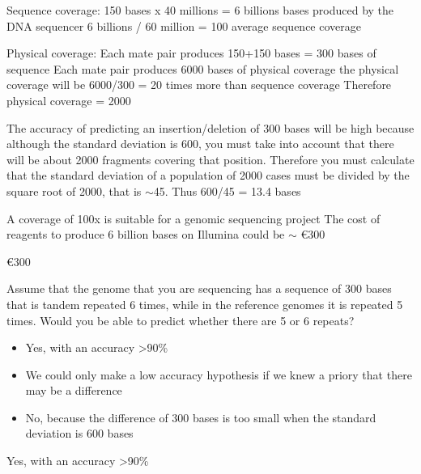 \begin{Answer} [
  ref={ex30},
  number={1}
 ]

Sequence coverage:
150 bases x 40 millions = 6 billions bases produced by the DNA sequencer
6 billions / 60 million = 100 average sequence coverage

Physical coverage:
Each mate pair produces 150+150 bases = 300 bases of sequence
Each mate pair produces 6000 bases of physical coverage
the physical coverage will be 6000/300 = 20 times more than sequence coverage
Therefore physical coverage = 2000

The accuracy of predicting an insertion/deletion of 300 bases will be high
because although the standard deviation is 600, you must take into account that
there will be about 2000 fragments covering that position. Therefore you must
calculate that the standard deviation of a population of 2000 cases must be
divided by the square root of 2000, that is $\sim$45. Thus 600/45 = 13.4 bases

A coverage of 100x is suitable for a genomic sequencing project
The cost of reagents to produce 6 billion bases on Illumina could be $\sim$
\euro 300



\Question \euro 300

\end{Answer}

\begin{Exercise} [
  label={ex31},
  origin={G. Valle}
 ]

\Question Assume that the genome that you are sequencing has a sequence of 300
bases that is tandem repeated 6 times, while in the reference genomes it is
repeated 5 times. Would you be able to predict whether there are 5 or 6 repeats?
\begin{itemize}
\item Yes, with an accuracy >90\%
\item We could only make a low accuracy hypothesis if we knew a priory that
there may be a difference
\item No, because the difference of 300 bases is too small when the standard
deviation is 600 bases
\end{itemize}


\end{Exercise}

\begin{Answer} [
  ref={ex31},
  number={1}
 ]

\Question Yes, with an accuracy >90\%

\end{Answer}

